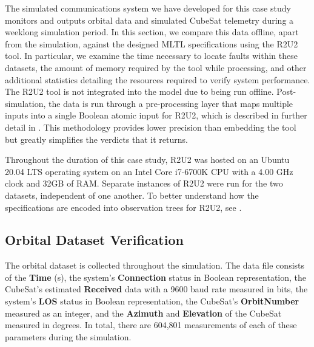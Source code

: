 \documentclass[conf]{new-aiaa}
\begin{document}
The simulated communications system we have developed for this case study monitors and outputs orbital data and simulated CubeSat telemetry during a weeklong simulation period. In this section, we compare this data offline, apart from the simulation, against the designed MLTL specifications using the R2U2 tool. In particular, we examine the time necessary to locate faults within these datasets, the amount of memory required by the tool while processing, and other additional statistics detailing the resources required to verify system performance. The R2U2 tool is not integrated into the model due to being run offline. Post-simulation, the data is run through a pre-processing layer that maps multiple inputs into a single Boolean atomic input for R2U2, which is described in further detail in \cite{Cauwels2020}. This methodology provides lower precision than embedding the tool but greatly simplifies the verdicts that it returns.

Throughout the duration of this case study, R2U2 was hosted on an Ubuntu 20.04 LTS operating system on an Intel Core i7-6700K CPU with a 4.00 GHz clock and 32GB of RAM. Separate instances of R2U2 were run for the two datasets, independent of one another. To better understand how the specifications are encoded into observation trees for R2U2, see \cite{Cauwels2020,SMR15,SMR16}.

\subsection{Orbital Dataset Verification}

The orbital dataset is collected throughout the simulation. The data file consists of the \textbf{Time} (s), the system's \textbf{Connection} status in Boolean representation, the CubeSat's estimated \textbf{Received} data with a 9600 baud rate measured in bits, the system's \textbf{LOS} status in Boolean representation,	the CubeSat's \textbf{OrbitNumber} measured as an integer, and the \textbf{Azimuth} and \textbf{Elevation} of the CubeSat measured in degrees. In total, there are 604,801 measurements of each of these parameters during the simulation.
\end{document}

